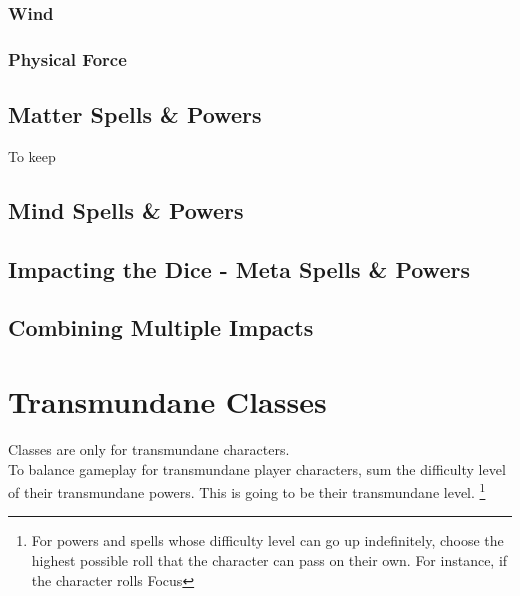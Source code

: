 \documentclass{LegrandOrangeTufteBook}
\newcommand{\termCore}[1]{\textcolor{colorCoreCompetency}{#1}}
\newcommand{\term}[1]{\textcolor{colorTerm}{#1}}
\begin{document}
\subsubsection*{Wind}

\subsubsection*{Physical Force}

\subsection*{Matter Spells \& Powers}

To keep

\subsection*{Mind Spells \& Powers}

\subsection*{Impacting the Dice - Meta Spells \& Powers}

\subsection*{Combining Multiple Impacts}



\section*{Transmundane Classes}

Classes are only for \term{transmundane} characters.\\

To balance gameplay for \term{transmundane} player characters,
sum the \term{difficulty level} of their \term{transmundane} powers.
This is going to be their \term{transmundane level}.
\footnote{
    For powers and spells whose \term{difficulty level} can go up indefinitely, choose the highest possible roll that the character can pass on their own.
    For instance, if the character rolls \termCore{Focus}
}
\\
\end{document}
